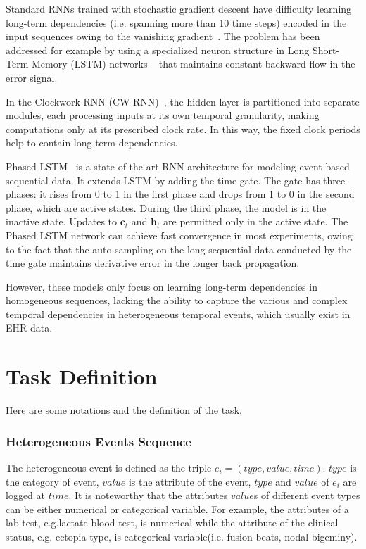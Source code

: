 \documentclass[letterpaper]{article} %
\begin{document}
 Standard RNNs trained with stochastic gradient descent
have difficulty learning long-term dependencies (i.e. spanning
more than 10 time steps) encoded in the input sequences
owing to the vanishing gradient~\cite{hochreiter2001gradient}. The problem has been addressed for example by using a specialized neuron structure in Long Short-Term Memory (LSTM) networks ~\cite{hochreiter1997long} that maintains constant backward flow in the error signal.

In the Clockwork RNN (CW-RNN)~\cite{koutnik2014clockwork}, the hidden layer is partitioned into separate modules, each processing inputs at its own temporal granularity, making computations only at its prescribed clock rate. In this way, the fixed clock periods help to contain long-term dependencies.

Phased LSTM ~\cite{neil2016phased}is a state-of-the-art RNN architecture for modeling event-based sequential data. It extends LSTM by adding the time gate.  The gate has three phases: it rises from 0 to 1 in the first phase and drops from 1 to 0 in the second phase, which are active states. During the third phase, the model is in the inactive state. Updates to $\bm c_t$ and $\bm h_t$ are permitted only in the active state. The Phased LSTM network can achieve fast convergence in most experiments, owing to the fact that the auto-sampling on the long sequential data conducted by the time gate maintains derivative error in the longer back propagation. 

However, these models only focus on learning long-term dependencies in homogeneous sequences, lacking the ability to capture the various and complex temporal dependencies in heterogeneous temporal events, which usually exist in EHR data. 



\section{Task Definition}
Here are some notations and the definition of the task.

\subsubsection{Heterogeneous Events Sequence}
The heterogeneous event is defined as the triple $e_i = (type,value,time)$.  $type$ is the category of event, $value$ is the attribute of the event, $type$ and $value$ of $e_i$ are logged at $time$.  %
It is noteworthy that the attributes $value$s of different event types  can be either numerical or categorical variable. For example, the attributes of a lab test, e.g.lactate blood  test, is numerical while the attribute of the clinical status, e.g. ectopia type, is categorical variable(i.e. fusion beats, nodal bigeminy).
\end{document}
